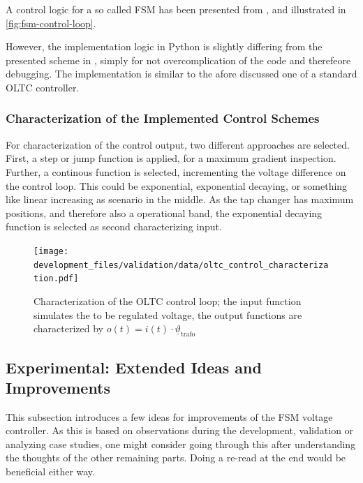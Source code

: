A control logic for a so called \acs{FSM} has been presented from \textcite{burlakin_2024}, and illustrated in \autoref{fig:fsm-control-loop}.

However, the implementation logic in Python is slightly differing from the presented scheme in \autocite{burlakin_2024}, simply for not overcomplication of the code and therefeore debugging. 
The implementation is similar to the afore discussed one of a standard \acs{OLTC} controller. 


\subsubsection{Characterization of the Implemented Control Schemes}

For characterization of the control output, two different approaches are selected.
First, a step or jump function is applied, for a maximum gradient inspection.
Further, a continous function is selected, incrementing the voltage difference on the control loop.
This could be exponential, exponential decaying, or something like linear increasing as scenario in the middle.
As the tap changer has maximum positions, and therefore also a operational band, the exponential decaying function is selected as second characterizing input.

\begin{figure}[htbp!]
        \centering
        \texttt{[image: development\_files/validation/data/oltc\_control\_characterization.pdf]}
        \caption[Characterization of the OLTC control loops]{Characterization of the OLTC control loop; the input function simulates the to be regulated voltage, the output functions are characterized by $o(t)=i(t) \cdot \underline{\vartheta}_\mathrm{trafo}$}
        \label{fig:oltc-control-characterization}
\end{figure}

\subsection{Experimental: Extended Ideas and Improvements}
\label{sec:experimental-modeling}

This subsection introduces a few ideas for improvements of the \acs{FSM} voltage controller.
As this is based on observations during the development, validation or analyzing case studies, one might consider going through this after understanding the thoughts of the other remaining parts.
Doing a re-read at the end would be beneficial either way.   

